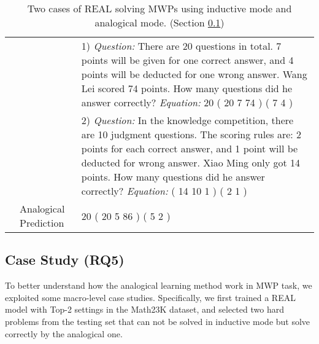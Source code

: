 \documentclass[11pt, a4paper]{article}
\begin{document}
\begin{table*}[t]
\begin{tabular}{|l|p{}|p{}|}
						   &  & 1) \emph{Question:} There are 20 questions in total. 7 points will be given for one correct answer, and 4 points will be deducted for one wrong answer. Wang Lei scored 74 points. How many questions did he answer correctly? \newline \emph{Equation:} 20  ( 20  7  74 )  ( 7  4 )                                                                                                    \\  
						   &                                    & 2) \emph{Question:} In the knowledge competition, there are 10 judgment questions. The scoring rules are: 2 points for each correct answer, and 1 point will be deducted for wrong answer. Xiao Ming only got 14 points. How many questions did he answer correctly? \newline \emph{Equation:}  ( 14  10  1 )  ( 2  1 )                                                                                                            \\  
						   & Analogical Prediction                 &  20  ( 20  5  86 )  ( 5  2 )  {\color{green}\checkmark}                                                                                                                                                         \\ \hline
	\end{tabular}
	\caption{Two cases of REAL solving MWPs using inductive mode and analogical mode. (Section \ref{section: cs})}
	\label{table: cs}
	\end{table*}
	
	\subsection{Case Study (RQ5)} \label{section: cs}
	To better understand how the analogical learning method work in MWP task, we exploited some  macro-level case studies. Specifically, we first trained a REAL model with Top-2 settings in the Math23K dataset, and selected two hard problems from the testing set that can not be solved in inductive mode but solve correctly by the analogical one.
	
\end{document}
